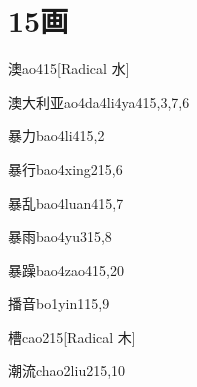 
\section*{15画}

\begin{verbete}{澳}{ao4}{15}[Radical 水]
\end{verbete}

\begin{verbete}{澳大利亚}{ao4da4li4ya4}{15,3,7,6}
\end{verbete}

\begin{verbete}{暴力}{bao4li4}{15,2}
\end{verbete}

\begin{verbete}{暴行}{bao4xing2}{15,6}
\end{verbete}

\begin{verbete}{暴乱}{bao4luan4}{15,7}
\end{verbete}

\begin{verbete}{暴雨}{bao4yu3}{15,8}
\end{verbete}

\begin{verbete}{暴躁}{bao4zao4}{15,20}
\end{verbete}

\begin{verbete}{播音}{bo1yin1}{15,9}
\end{verbete}

\begin{verbete}{槽}{cao2}{15}[Radical ⽊]
\end{verbete}

\begin{verbete}{潮流}{chao2liu2}{15,10}
\end{verbete}


